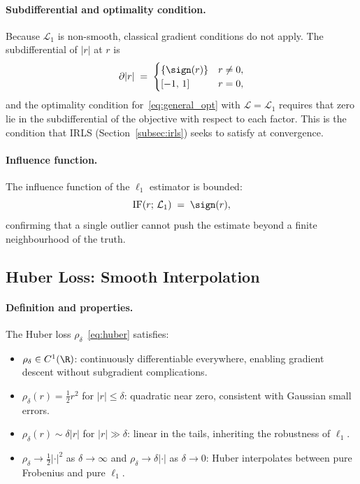 \paragraph{Subdifferential and optimality condition.}
Because $\mathcal{L}_1$ is non-smooth, classical gradient conditions do
not apply.
The subdifferential of $|r|$ at $r$ is
\begin{equation}
  \partial|r|
  \;=\; \begin{cases}
          \{\sign(r)\} & r \neq 0, \\
          [-1,\, 1]    & r = 0,
        \end{cases}
  \label{eq:subgrad_l1}
\end{equation}
and the optimality condition for~\eqref{eq:general_opt} with
$\mathcal{L} = \mathcal{L}_1$ requires that zero lie in the
subdifferential of the objective with respect to each factor.
This is the condition that IRLS (Section~\ref{subsec:irls}) seeks to
satisfy at convergence.

\paragraph{Influence function.}
The influence function of the $\ell_1$ estimator is bounded:
\begin{equation}
  \mathrm{IF}(r;\, \mathcal{L}_1) \;=\; \sign(r),
  \label{eq:if_l1}
\end{equation}
confirming that a single outlier cannot push the estimate beyond a finite
neighbourhood of the truth.

\subsection{Huber Loss: Smooth Interpolation}
\label{subsec:huber_analysis}

\paragraph{Definition and properties.}
The Huber loss $\rho_\delta$~\eqref{eq:huber} satisfies:
\begin{itemize}
  \item $\rho_\delta \in C^1(\R)$: continuously differentiable everywhere,
        enabling gradient descent without subgradient complications.
  \item $\rho_\delta(r) = \tfrac{1}{2}r^2$ for $|r| \leq \delta$:
        quadratic near zero, consistent with Gaussian small errors.
  \item $\rho_\delta(r) \sim \delta|r|$ for $|r| \gg \delta$:
        linear in the tails, inheriting the robustness of $\ell_1$.
  \item $\rho_\delta \to \tfrac{1}{2}|\cdot|^2$ as $\delta \to \infty$
        and $\rho_\delta \to \delta|\cdot|$ as $\delta \to 0$:
        Huber interpolates between pure Frobenius and pure $\ell_1$.
\end{itemize}

